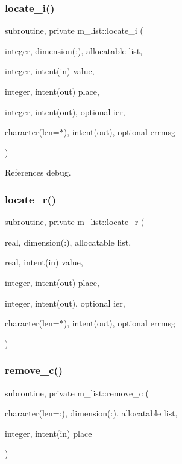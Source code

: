 \subsubsection{\texorpdfstring{locate\+\_\+i()}{locate\_i()}}
{\footnotesize\ttfamily subroutine, private m\+\_\+list\+::locate\+\_\+i (\begin{DoxyParamCaption}\item[{integer, dimension(\+:), allocatable}]{list,  }\item[{integer, intent(in)}]{value,  }\item[{integer, intent(out)}]{place,  }\item[{integer, intent(out), optional}]{ier,  }\item[{character(len=$\ast$), intent(out), optional}]{errmsg }\end{DoxyParamCaption})\hspace{0.3cm}{\ttfamily [private]}}



References debug.

\mbox{\label{namespacem__list_a533a0e5b16558efb391913e881a57040}} 
\subsubsection{\texorpdfstring{locate\+\_\+r()}{locate\_r()}}
{\footnotesize\ttfamily subroutine, private m\+\_\+list\+::locate\+\_\+r (\begin{DoxyParamCaption}\item[{real, dimension(\+:), allocatable}]{list,  }\item[{real, intent(in)}]{value,  }\item[{integer, intent(out)}]{place,  }\item[{integer, intent(out), optional}]{ier,  }\item[{character(len=$\ast$), intent(out), optional}]{errmsg }\end{DoxyParamCaption})\hspace{0.3cm}{\ttfamily [private]}}

\mbox{\label{namespacem__list_a216c9ec18769ee63a769cc25bc273022}} 
\subsubsection{\texorpdfstring{remove\+\_\+c()}{remove\_c()}}
{\footnotesize\ttfamily subroutine, private m\+\_\+list\+::remove\+\_\+c (\begin{DoxyParamCaption}\item[{character(len=\+:), dimension(\+:), allocatable}]{list,  }\item[{integer, intent(in)}]{place }\end{DoxyParamCaption})\hspace{0.3cm}{\ttfamily [private]}}



